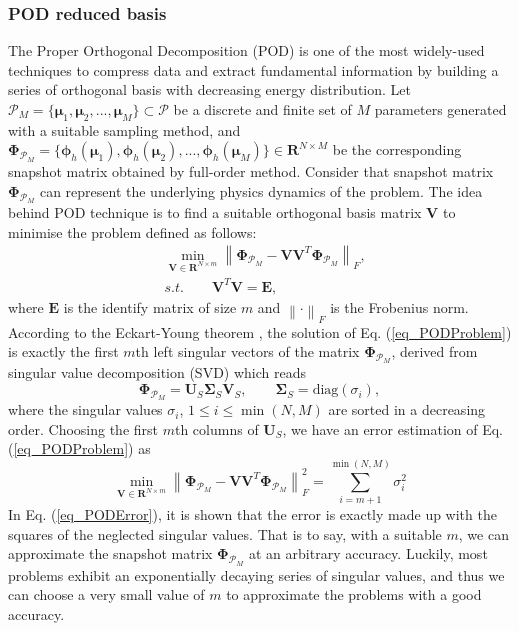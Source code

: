 \documentclass[preprint, 10pt]{elsarticle}
\begin{document}
\subsubsection{POD reduced basis}
The Proper Orthogonal Decomposition (POD) is one of the most widely-used techniques to compress data and extract fundamental information by building a series of orthogonal basis
with decreasing energy distribution.
Let $\mathcal{P}_M=\{\pmb{\mu}_1, \pmb{\mu}_2,...,\pmb{\mu}_M\} \subset \mathcal{P}$ be a discrete and finite set of $M$ parameters generated with a suitable sampling method, and $\pmb {\Phi}_{\mathcal{P}_M}=\{\pmb{\phi}_h(\pmb{\mu}_1), \pmb{\phi}_h(\pmb{\mu}_2),...,\pmb{\phi}_h(\pmb{\mu}_M)\}  \in \mathbf{R}^{N \times M}$ be the corresponding snapshot matrix obtained by full-order method. Consider that snapshot matrix $\pmb {\Phi}_{\mathcal{P}_M}$ can represent the underlying physics dynamics of the problem. The idea behind POD technique is to find a suitable orthogonal basis matrix $\mathbf{V}$ to minimise the problem defined as follows:
\begin{equation}
\begin{aligned}
&\mathop {\min}\limits_{\mathbf{V} \in \mathbf{R}^{N\times m}}
\left\| {\pmb {\Phi}_{\mathcal{P}_M} - \mathbf{V}\mathbf{V}^T \pmb {\Phi}_{\mathcal{P}_M}} \right\|_F, \\
&s.t. \qquad \mathbf{V}^T\mathbf{V} = \mathbf{E},
\end{aligned}
\label{eq_PODProblem}
\end{equation}
where $\mathbf{E}$ is the identify matrix of size $m$ and $\left\| \cdot \right\|_F$ is the Frobenius norm.
According to the Eckart-Young theorem \cite{eckart1936approximation}, the solution of Eq. (\ref{eq_PODProblem}) is exactly  the first $m$th left singular vectors of the matrix $\pmb {\Phi}_{\mathcal{P}_M}$, derived from singular value decomposition (SVD) which reads
\begin{equation}
\pmb {\Phi}_{\mathcal{P}_M} = \mathbf{U}_S \pmb{\Sigma} _S \mathbf{V}_S,
\qquad \pmb{\Sigma} _S = \text{diag} \left(  \sigma _i  \right),
\end{equation}
where  the singular values $\sigma _i$, $1 \le i \le \min(N,M)$ are sorted in a decreasing order. Choosing the first $m$th columns of
 $\mathbf{U}_S$, we have an error estimation of Eq. (\ref{eq_PODProblem}) as
 \begin{equation}
 \mathop {\min}\limits_{\mathbf{V} \in \mathbf{R}^{N\times m}}
\left\| {\pmb {\Phi}_{\mathcal{P}_M} - \mathbf{V}\mathbf{V}^T \pmb {\Phi}_{\mathcal{P}_M}} \right\|_{F}^{2}
=\sum_{i=m+1}^{\min(N,M)} \sigma _{i}^{2}
\label{eq_PODError}
 \end{equation}
In Eq. (\ref{eq_PODError}), it is shown that the error is exactly made up with  the squares of the neglected singular values. That is to say, with a suitable $m$, we can approximate the snapshot matrix $\pmb {\Phi}_{\mathcal{P}_M}$ at an arbitrary accuracy.  Luckily, most problems exhibit an exponentially decaying series of singular values, and thus we can choose a very small value of $m$ to approximate the problems with a good accuracy.
\end{document}
